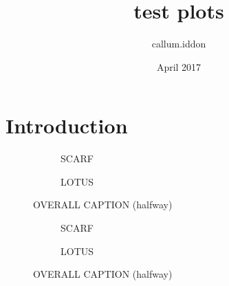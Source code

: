 \documentclass{article}
\title{test plots}
\author{callum.iddon }
\date{April 2017}
\begin{document}
\maketitle

\section{Introduction}


\newlength\figureheight
\newlength\figurewidth
\setlength\figureheight{7cm}
\setlength\figurewidth{\textwidth}

\begin{landscape}
 \begin{figure}[H]
    \centering
    \begin{subfigure}{\textwidth}
      \centering
        
      \caption{SCARF}
    \end{subfigure}

    \begin{subfigure}{\textwidth}
      \centering
        
      \caption{LOTUS}
    \end{subfigure}
    \caption{OVERALL CAPTION (halfway)}
 \end{figure}

 \begin{figure}[H]\ContinuedFloat
    \centering
    \begin{subfigure}{\textwidth}
      \centering
        
      \caption{SCARF}
    \end{subfigure}

    \begin{subfigure}{\textwidth}
      \centering
        
      \caption{LOTUS}
    \end{subfigure}
    \caption{OVERALL CAPTION (halfway)}
 \end{figure}
\end{landscape}
\end{document}
